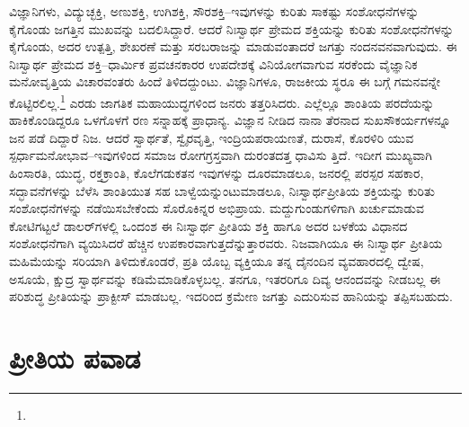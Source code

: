 ವಿಜ್ಞಾನಿಗಳು, ವಿದ್ಯುಚ್ಛಕ್ತಿ, ಅಣುಶಕ್ತಿ, ಉಗಿಶಕ್ತಿ, ಸೌರಶಕ್ತಿ–ಇವುಗಳನ್ನು ಕುರಿತು ಸಾಕಷ್ಟು ಸಂಶೋಧನೆಗಳನ್ನು ಕೈಗೊಂಡು ಜಗತ್ತಿನ ಮುಖವನ್ನು ಬದಲಿಸಿದ್ದಾರೆ. ಆದರೆ ನಿಃಸ್ವಾರ್ಥ ಪ್ರೇಮದ ಶಕ್ತಿಯನ್ನು ಕುರಿತು ಸಂಶೋಧನೆಗಳನ್ನು ಕೈಗೊಂಡು, ಅದರ ಉತ್ಪತ್ತಿ, ಶೇಖರಣೆ ಮತ್ತು ಸರಬರಾಜನ್ನು ಮಾಡುವಂತಾದರೆ ಜಗತ್ತು ನಂದನವನವಾಗುವುದು. ಈ ನಿಃಸ್ವಾರ್ಥ ಪ್ರೇಮದ ಶಕ್ತಿ–ಧಾರ್ಮಿಕ ಪ್ರವಚನಕಾರರ ಉಪದೇಶಕ್ಕೆ ವಿನಿಯೋಗವಾಗುವ ಸರಕೆಂದು ವೈಜ್ಞಾನಿಕ ಮನೋವೃತ್ತಿಯ ವಿಚಾರವಂತರು ಹಿಂದೆ ತಿಳಿದದ್ದುಂಟು. ವಿಜ್ಞಾನಿಗಳೂ, ರಾಜಕೀಯ ಸ್ಥರೂ ಈ ಬಗ್ಗೆ ಗಮನವನ್ನೇ ಕೊಟ್ಟಿರಲಿಲ್ಲ.\footnote{\hfill{}} ಎರಡು ಜಾಗತಿಕ ಮಹಾಯುದ್ಧಗಳಿಂದ ಜನರು ತತ್ತರಿಸಿದರು. ಎಲ್ಲೆಲ್ಲೂ ಶಾಂತಿಯ ಪರದೆಯನ್ನು ಹಾಕಿಕೊಂಡಿದ್ದರೂ ಒಳಗೊಳಗೆ ರಣ ಸನ್ನಾಹಕ್ಕೆ ಪ್ರಾಧಾನ್ಯ. ವಿಜ್ಞಾನ ನೀಡಿದ ನಾನಾ ತೆರನಾದ ಸುಖಸೌಕರ್ಯಗಳನ್ನೂ ಜನ ಪಡೆ ದಿದ್ದಾರೆ ನಿಜ. ಆದರೆ ಸ್ವಾರ್ಥತೆ, ಸ್ವೈರವೃತ್ತಿ, ಇಂದ್ರಿಯಪರಾಯಣತೆ, ದುರಾಸೆ, ಕೊರಳಿರಿ ಯುವ ಸ್ಪರ್ಧಾಮನೋಭಾವ–ಇವುಗಳಿಂದ ಸಮಾಜ ರೋಗಗ್ರಸ್ತವಾಗಿ ದುರಂತದತ್ತ ಧಾವಿಸು ತ್ತಿದೆ. ಇದೀಗ ಮುಖ್ಯವಾಗಿ ಹಿಂಸಾರತಿ, ಯುದ್ಧ, ರಕ್ತಕ್ರಾಂತಿ, ಕೊಲೆಗಡುಕತನ ಇವುಗಳನ್ನು ದೂರಮಾಡಲೂ, ಜನರಲ್ಲಿ ಪರಸ್ಪರ ಸಹಕಾರ, ಸದ್ಭಾವನೆಗಳನ್ನು ಬೆಳೆಸಿ ಶಾಂತಿಯುತ ಸಹ ಬಾಳ್ವೆಯನ್ನುಂಟುಮಾಡಲೂ, ನಿಃಸ್ವಾರ್ಥಪ್ರೀತಿಯ ಶಕ್ತಿಯನ್ನು ಕುರಿತು ಸಂಶೋಧನೆಗಳನ್ನು ನಡೆಯಿಸಬೇಕೆಂದು ಸೊರೊಕಿನ್ನರ ಅಭಿಪ್ರಾಯ. ಮದ್ದುಗುಂಡುಗಳಿಗಾಗಿ ಖರ್ಚುಮಾಡುವ ಕೋಟಿಗಟ್ಟಲೆ ಡಾಲರ್​ಗಳಲ್ಲಿ ಒಂದಂಶ ಈ ನಿಃಸ್ವಾರ್ಥ ಪ್ರೀತಿಯ ಶಕ್ತಿ ಹಾಗೂ ಅದರ ಬಳಕೆಯ ವಿಧಾನದ ಸಂಶೋಧನೆಗಾಗಿ ವ್ಯಯಿಸಿದರೆ ಹೆಚ್ಚಿನ ಉಪಕಾರವಾಗುತ್ತದೆನ್ನುತ್ತಾರವರು. ನಿಜವಾಗಿಯೂ ಈ ನಿಃಸ್ವಾರ್ಥ ಪ್ರೀತಿಯ ಮಹಿಮೆಯನ್ನು ಸರಿಯಾಗಿ ತಿಳಿದುಕೊಂಡರೆ, ಪ್ರತಿ ಯೊಬ್ಬ ವ್ಯಕ್ತಿಯೂ ತನ್ನ ದೈನಂದಿನ ವ್ಯವಹಾರದಲ್ಲಿ ದ್ವೇಷ, ಅಸೂಯೆ, ಕ್ಷುದ್ರ ಸ್ವಾರ್ಥವನ್ನು ಕಡಿಮೆಮಾಡಿಕೊಳ್ಳಬಲ್ಲ. ತನಗೂ, ಇತರರಿಗೂ ದಿವ್ಯ ಆನಂದವನ್ನು ನೀಡಬಲ್ಲ ಈ ಪರಿಶುದ್ಧ ಪ್ರೀತಿಯನ್ನು ಪ್ರಾಕ್ಟೀಸ್ ಮಾಡಬಲ್ಲ. ಇದರಿಂದ ಕ್ರಮೇಣ ಜಗತ್ತು ಎದುರಿಸುವ ಹಾನಿಯನ್ನು ತಪ್ಪಿಸಬಹುದು.


\section{ಪ್ರೀತಿಯ ಪವಾಡ}

